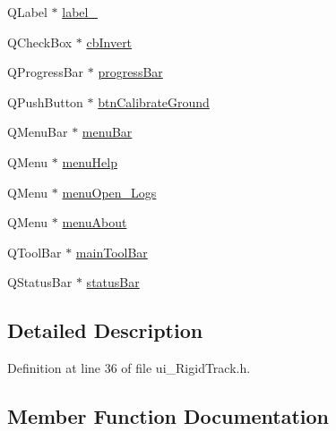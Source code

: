 \begin{DoxyCompactItemize}
\item 
Q\+Label $\ast$ \hyperlink{class_ui___rigid_track_class_aa8e51b4d3909b5d36d9d64961d2648a3}{label\+\_}
\item 
Q\+Check\+Box $\ast$ \hyperlink{class_ui___rigid_track_class_a370014fb6d177a07220b69155b4c101b}{cb\+Invert}
\item 
Q\+Progress\+Bar $\ast$ \hyperlink{class_ui___rigid_track_class_a4f53c207d82dc9555709f1ace400d89b}{progress\+Bar}
\item 
Q\+Push\+Button $\ast$ \hyperlink{class_ui___rigid_track_class_a7497d27bfd5a03243079fdb055291264}{btn\+Calibrate\+Ground}
\item 
Q\+Menu\+Bar $\ast$ \hyperlink{class_ui___rigid_track_class_ae5991e1872fe74ac542cf0fdca8d4d0e}{menu\+Bar}
\item 
Q\+Menu $\ast$ \hyperlink{class_ui___rigid_track_class_a2df43c6bb7db7e366a64bc8dbbbab7cc}{menu\+Help}
\item 
Q\+Menu $\ast$ \hyperlink{class_ui___rigid_track_class_a1df91ff9df043558cf6d3c1dd6557250}{menu\+Open\+\_\+\+Logs}
\item 
Q\+Menu $\ast$ \hyperlink{class_ui___rigid_track_class_a4c36fbc72f56540b472d7a8724690896}{menu\+About}
\item 
Q\+Tool\+Bar $\ast$ \hyperlink{class_ui___rigid_track_class_abb7105788d67491618ebd4229964f992}{main\+Tool\+Bar}
\item 
Q\+Status\+Bar $\ast$ \hyperlink{class_ui___rigid_track_class_ac1ced4ae725bc0095307704d5d4fc4f2}{status\+Bar}
\end{DoxyCompactItemize}


\subsection{Detailed Description}


Definition at line 36 of file ui\+\_\+\+Rigid\+Track.\+h.



\subsection{Member Function Documentation}
\mbox{\label{class_ui___rigid_track_class_a7c96951c4e173848e7695d6bd7883af6}} 
